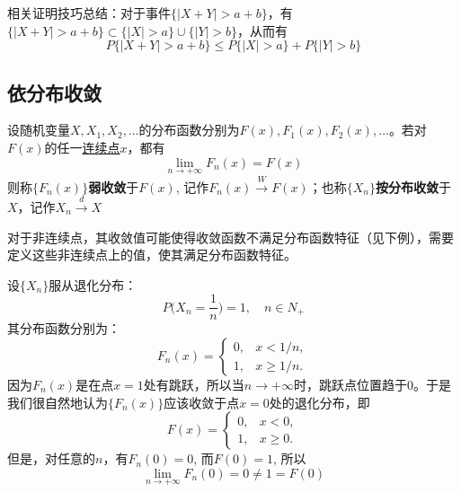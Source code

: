 \begin{note}
    相关证明技巧总结：对于事件$\{ |X+Y| > a+b \}$，有$\{ |X+Y| > a+b \} \subset \{ |X|>a \} \cup \{ |Y|>b \}$，从而有
    \[ P\{ |X+Y| > a+b \} \le P\{ |X|>a \} + P\{ |Y|>b \} \]
\end{note}

\subsection{依分布收敛}

\begin{definition}[依分布收敛]
    设随机变量$X, X_1, X_2, \dotsc$的分布函数分别为$F(x), F_1(x), F_2(x), \dotsc$。若对$F(x)$的任一\underline{连续点}$x$，都有
    \[ \lim_{n \to +\infty} F_n(x) = F(x) \]
    则称$\{ F_n(x) \}$\textbf{弱收敛}于$F(x)$, 记作$F_n(x) \xrightarrow{W} F(x)$；也称$\{ X_n \}$\textbf{按分布收敛}于$X$，记作$X_n \xrightarrow{d} X$
\end{definition}
\begin{remark}
    对于非连续点，其收敛值可能使得收敛函数不满足分布函数特征（见下例），需要定义这些非连续点上的值，使其满足分布函数特征。
\end{remark}

\begin{example}
    设$\{ X_n \}$服从退化分布：
    \[ P \biggl( X_n = \frac1{n} \biggr) = 1, \quad n \in N_+\]
    其分布函数分别为：
    \[ F_n( x ) = \begin{cases}
            0, & x < 1/n,    \\
            1, & x \geq 1/n.
        \end{cases} \]
    因为$F_n(x)$是在点$x=1$处有跳跃，所以当$n \to +\infty$时，跳跃点位置趋于0。于是我们很自然地认为$\{ F_n(x) \}$应该收敛于点$x=0$处的退化分布，即
    \[ F(x) = \begin{cases}
            0, & x < 0,    \\
            1, & x \geq 0.
        \end{cases} \]
    但是，对任意的$n$，有$F_n(0) = 0$, 而$F(0) = 1$, 所以
    \[ \lim_{n \to +\infty} F_n(0) = 0 \neq 1 = F(0) \]
\end{example}

